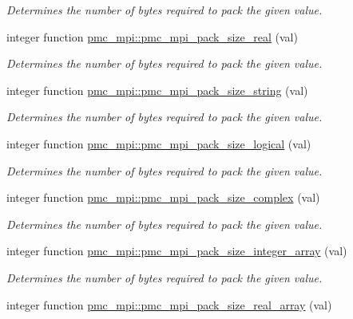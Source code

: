 \begin{DoxyCompactItemize}
\begin{DoxyCompactList}\small\item\em Determines the number of bytes required to pack the given value. \end{DoxyCompactList}\item 
integer function \mbox{\hyperlink{namespacepmc__mpi_a58c6890069ac044e640bb67211ef9b52}{pmc\+\_\+mpi\+::pmc\+\_\+mpi\+\_\+pack\+\_\+size\+\_\+real}} (val)
\begin{DoxyCompactList}\small\item\em Determines the number of bytes required to pack the given value. \end{DoxyCompactList}\item 
integer function \mbox{\hyperlink{namespacepmc__mpi_aa497879e21deb212bd15ee56092de3cd}{pmc\+\_\+mpi\+::pmc\+\_\+mpi\+\_\+pack\+\_\+size\+\_\+string}} (val)
\begin{DoxyCompactList}\small\item\em Determines the number of bytes required to pack the given value. \end{DoxyCompactList}\item 
integer function \mbox{\hyperlink{namespacepmc__mpi_a679ca4ddcb8cd9747732378752108fda}{pmc\+\_\+mpi\+::pmc\+\_\+mpi\+\_\+pack\+\_\+size\+\_\+logical}} (val)
\begin{DoxyCompactList}\small\item\em Determines the number of bytes required to pack the given value. \end{DoxyCompactList}\item 
integer function \mbox{\hyperlink{namespacepmc__mpi_a95b5f087dc05777d8c4966dc41b19fb1}{pmc\+\_\+mpi\+::pmc\+\_\+mpi\+\_\+pack\+\_\+size\+\_\+complex}} (val)
\begin{DoxyCompactList}\small\item\em Determines the number of bytes required to pack the given value. \end{DoxyCompactList}\item 
integer function \mbox{\hyperlink{namespacepmc__mpi_a9e1a99bb575c905e2694fbece029efc1}{pmc\+\_\+mpi\+::pmc\+\_\+mpi\+\_\+pack\+\_\+size\+\_\+integer\+\_\+array}} (val)
\begin{DoxyCompactList}\small\item\em Determines the number of bytes required to pack the given value. \end{DoxyCompactList}\item 
integer function \mbox{\hyperlink{namespacepmc__mpi_a6f2847e4b691b9ab8e007da1adb6c54c}{pmc\+\_\+mpi\+::pmc\+\_\+mpi\+\_\+pack\+\_\+size\+\_\+real\+\_\+array}} (val)

\end{DoxyCompactItemize}
